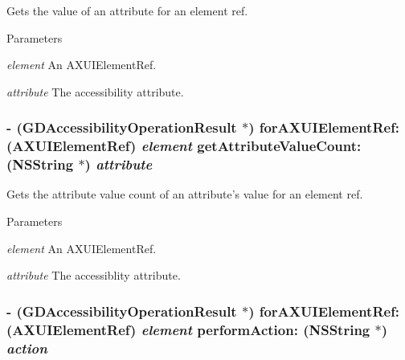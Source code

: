 Gets the value of an attribute for an element ref. 
\begin{DoxyParams}{Parameters}
\item[{\em element}]An AXUIElementRef. \item[{\em attribute}]The accessibility attribute. \end{DoxyParams}
\hypertarget{interface_g_d_accessibility_manager_a043c9bc6dd9c456ccf038eef0c765dcd}{
\subsubsection[{forAXUIElementRef:getAttributeValueCount:}]{\setlength{\rightskip}{0pt plus 5cm}-\/ ({\bf GDAccessibilityOperationResult} $\ast$) forAXUIElementRef: (AXUIElementRef) {\em element}\/ getAttributeValueCount: ({\bf NSString} $\ast$) {\em attribute}}}
\label{interface_g_d_accessibility_manager_a043c9bc6dd9c456ccf038eef0c765dcd}


Gets the attribute value count of an attribute's value for an element ref. 
\begin{DoxyParams}{Parameters}
\item[{\em element}]An AXUIElementRef. \item[{\em attribute}]The accessiblity attribute. \end{DoxyParams}
\hypertarget{interface_g_d_accessibility_manager_a365dbd94f222b04c86141c83c1542e68}{
\subsubsection[{forAXUIElementRef:performAction:}]{\setlength{\rightskip}{0pt plus 5cm}-\/ ({\bf GDAccessibilityOperationResult} $\ast$) forAXUIElementRef: (AXUIElementRef) {\em element}\/ performAction: ({\bf NSString} $\ast$) {\em action}}}
\label{interface_g_d_accessibility_manager_a365dbd94f222b04c86141c83c1542e68}


